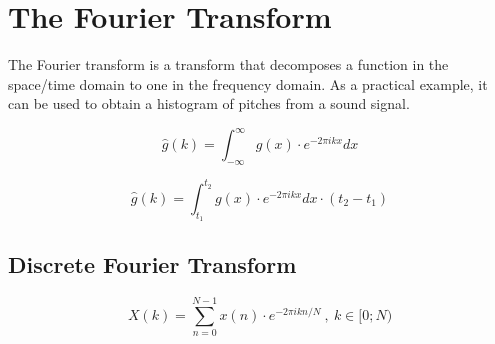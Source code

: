 \section{The Fourier Transform}
The Fourier transform is a transform
that decomposes a function in the space/time domain to one in the frequency domain. %
As a practical example, it can be used to obtain a histogram of pitches from a sound signal.

\begin{equation}
     \hat g(k) = \int_{-\infty}^{\infty} g(x) \cdot e^{-2 \pi i k x} dx
\end{equation}

\begin{equation}
     \hat g(k) = \int_{t_1}^{t_2} g(x) \cdot e^{-2 \pi i k x} dx \cdot (t_2 - t_1)
\end{equation}

\subsection{Discrete Fourier Transform}
\begin{equation}
    X(k) = \sum_{n = 0}^{N - 1} x(n) \cdot e^{-2 \pi i kn / N} ~,~ k \in [0; N)
\end{equation}
